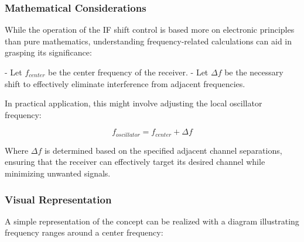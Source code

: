 \subsubsection{Mathematical Considerations}

While the operation of the IF shift control is based more on electronic principles than pure mathematics, understanding frequency-related calculations can aid in grasping its significance:

- Let \( f_{center} \) be the center frequency of the receiver.
- Let \( \Delta f \) be the necessary shift to effectively eliminate interference from adjacent frequencies.

In practical application, this might involve adjusting the local oscillator frequency:

\[
f_{oscillator} = f_{center} + \Delta f
\]

Where \( \Delta f \) is determined based on the specified adjacent channel separations, ensuring that the receiver can effectively target its desired channel while minimizing unwanted signals.

\subsubsection{Visual Representation}

A simple representation of the concept can be realized with a diagram illustrating frequency ranges around a center frequency:

\begin{center}
\end{center}
